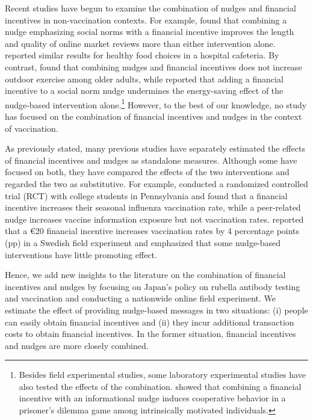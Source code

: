 \documentclass[
  11pt,
  a4paper
]{article}
\begin{document}
Recent studies have begun to examine the combination of nudges and financial incentives in non-vaccination contexts. For example, \citet{Burtch2018} found that combining a nudge emphasizing social norms with a financial incentive improves the length and quality of online market reviews more than either intervention alone. \citet{Thorndike2016} reported similar results for healthy food choices in a hospital cafeteria. By contrast, \citet{Kullgren2014} found that combining nudges and financial incentives does not increase outdoor exercise among older adults, while \citet{Pellerano2017} reported that adding a financial incentive to a social norm nudge undermines the energy-saving effect of the nudge-based intervention alone.\footnote{Besides field experimental studies, some laboratory experimental studies have also tested the effects of the combination. \citet{Chen2021} showed that combining a financial incentive with an informational nudge induces cooperative behavior in a prisoner's dilemma game among intrinsically motivated individuals.} However, to the best of our knowledge, no study has focused on the combination of financial incentives and nudges in the context of vaccination.

As previously stated, many previous studies have separately estimated the effects of financial incentives \citep{Banerjee2010, Barber2022, Barham2009, Brehm2022} and nudges \citep{Dai2021, Chapman2010, Milkman2021, Sasaki2022} as standalone measures. Although some have focused on both, they have compared the effects of the two interventions and regarded the two as substitutive. For example, \citet{Bronchetti2015} conducted a randomized controlled trial (RCT) with college students in Pennsylvania and found that a financial incentive increases their seasonal influenza vaccination rate, while a peer-related nudge increases vaccine information exposure but not vaccination rates. \citet{Campos-Mercade2021a} reported that a €20 financial incentive increases vaccination rates by 4 percentage points (pp) in a Swedish field experiment and emphasized that some nudge-based interventions have little promoting effect.

Hence, we add new insights to the literature on the combination of financial incentives and nudges by focusing on Japan's policy on rubella antibody testing and vaccination and conducting a nationwide online field experiment. We estimate the effect of providing nudge-based messages in two situations: (i) people can easily obtain financial incentives and (ii) they incur additional transaction costs to obtain financial incentives. In the former situation, financial incentives and nudges are more closely combined.
\end{document}
